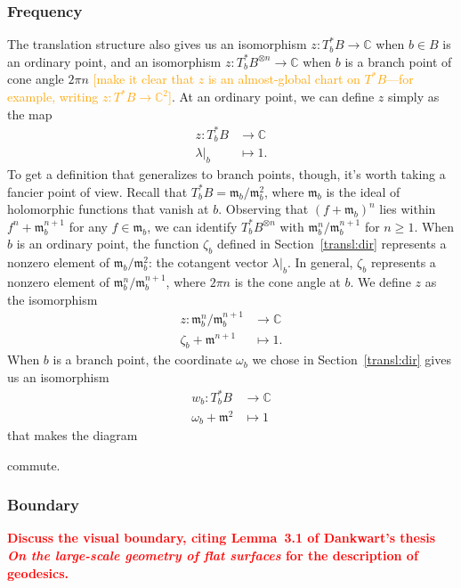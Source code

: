 \documentclass{article}
\newcommand{\maps}{\colon}
\newcommand{\C}{\mathbb{C}}
\newcommand{\blankbox}{{\fboxsep 0pt \colorbox{lightgray}{\phantom{$h$}}}}
\newcommand{\van}{\mathfrak{m}}
\theoremstyle{definition}
\theoremstyle{plain}
\begin{document}
\subsubsection{Frequency}\label{transl-freq}
%
The translation structure also gives us an isomorphism $z \maps T^*_bB \to \C$ when $b \in B$ is an ordinary point, and an isomorphism $z \maps T^*_bB^{\otimes n} \to \C$ when $b$ is a branch point of cone angle $2\pi n$ \textcolor{orange}{[make it clear that $z$ is an almost-global chart on $T^*B$---for example, writing $z\colon T^*B\to\C^2$]}. At an ordinary point, we can define $z$ simply as the map
\begin{align*}
z \maps T^*_bB & \to \C \\
\lambda\big|_b & \mapsto 1.
\end{align*}
To get a definition that generalizes to branch points, though, it's worth taking a fancier point of view. Recall that $T^*_bB = \van_b / \van_b^2$, where $\van_b$ is the ideal of holomorphic functions that vanish at $b$. Observing that $(f + \van_b)^n$ lies within $f^n + \van_b^{n+1}$ for any $f \in \van_b$, we can identify $T^*_bB^{\otimes n}$ with $\van_b^n / \van_b^{n+1}$ for $n \ge 1$. When $b$ is an ordinary point, the function $\zeta_b$ defined in Section~\ref{transl:dir} represents a nonzero element of $\van_b / \van_b^2$: the cotangent vector $\lambda\big|_b$. In general, $\zeta_b$ represents a nonzero element of $\van_b^n / \van_b^{n+1}$, where $2\pi n$ is the cone angle at $b$. We define $z$ as the isomorphism
\begin{align*}
z \maps \van_b^n / \van_b^{n+1} & \to \C \\
\zeta_b + \van^{n+1} & \mapsto 1.
\end{align*}
When $b$ is a branch point, the coordinate $\omega_b$ we chose in Section~\ref{transl:dir} gives us an isomorphism
\begin{align*}
w_b \maps T^*_bB & \to \C \\
\omega_b + \van^2 & \mapsto 1
\end{align*}
that makes the diagram
\begin{center}
\end{center}
commute.
\subsubsection{Boundary}
\textcolor{red}{\textbf{Discuss the visual boundary, citing Lemma~3.1 of Dankwart's thesis \textit{On the large-scale geometry of flat surfaces} for the description of geodesics.}}
%
\end{document}
